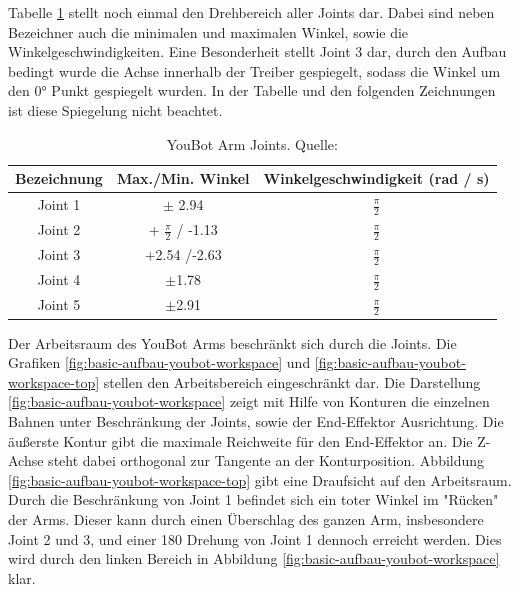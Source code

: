  
 Tabelle \ref{tab:basic-aufbau-youbot-joints} stellt noch einmal den Drehbereich aller Joints dar. Dabei sind neben Bezeichner auch die minimalen und maximalen Winkel, sowie die Winkelgeschwindigkeiten. Eine Besonderheit stellt Joint 3 dar, durch den Aufbau bedingt wurde die Achse innerhalb der Treiber gespiegelt, sodass die Winkel um den 0° Punkt gespiegelt wurden. In der Tabelle und den folgenden Zeichnungen ist diese Spiegelung nicht beachtet.
 
   \begin{table}[H]
   	\begin{tabular}{|c|c|c|}
   		\hline Bezeichnung & Max./Min. Winkel & Winkelgeschwindigkeit (rad / s) \\ 
   		\hline Joint 1 & $\pm$ 2.94 & $\frac{\pi}{2}$  \\ 
   		\hline Joint 2 & + $\frac{\pi}{2}$ / -1.13  & $\frac{\pi}{2}$ \\ 
   		\hline Joint 3 & +2.54 /-2.63 & $\frac{\pi}{2}$ \\ 
   		\hline Joint 4 & $\pm$1.78 & $\frac{\pi}{2}$ \\ 
   		\hline Joint 5 & $\pm$2.91 & $\frac{\pi}{2}$ \\ 
   		\hline 
   	\end{tabular}
   	\caption[YouBot Arm Joints]{YouBot Arm Joints. Quelle: \cite{monikaflorekjasinska2015}}
   	\label{tab:basic-aufbau-youbot-joints}
   \end{table}
   
   Der Arbeitsraum des YouBot Arms beschränkt sich durch die Joints. Die Grafiken \ref{fig:basic-aufbau-youbot-workspace} und \ref{fig:basic-aufbau-youbot-workspace-top} stellen den Arbeitsbereich eingeschränkt dar. Die Darstellung \ref{fig:basic-aufbau-youbot-workspace} zeigt mit Hilfe von Konturen die einzelnen Bahnen unter Beschränkung der Joints, sowie der End-Effektor Ausrichtung.  Die äußerste Kontur gibt die maximale Reichweite für den End-Effektor an. Die Z-Achse steht dabei orthogonal zur Tangente an der Konturposition. Abbildung \ref{fig:basic-aufbau-youbot-workspace-top} gibt eine Draufsicht auf den Arbeitsraum. Durch die Beschränkung von Joint 1 befindet sich ein toter Winkel im "Rücken" der Arms. Dieser kann durch einen Überschlag des ganzen Arm, insbesondere Joint 2 und 3, und einer 180 \textdegree Drehung von Joint 1 dennoch erreicht werden. Dies wird durch den linken Bereich in Abbildung \ref{fig:basic-aufbau-youbot-workspace} klar.
   
